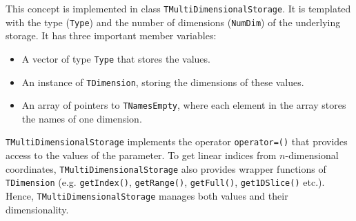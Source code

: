 \documentclass[a4paper,11pt]{article}
\newcommand{\class}[1]{\texttt{#1}}
\newcommand{\pubfunc}[1]{\texttt{#1()}}
\newcommand{\type}[1]{\texttt{#1}}
\begin{document}
This concept is implemented in class \class{TMultiDimensionalStorage}. It is templated with the type (\type{Type}) and the number of dimensions (\type{NumDim}) of the underlying storage. It has three important member variables:
\begin{itemize}
 \item A vector of type \type{Type} that stores the values.
 \item An instance of \class{TDimension}, storing the dimensions of these values.
 \item An array of pointers to \class{TNamesEmpty}, where each element in the array stores the names of one dimension.
\end{itemize}
\class{TMultiDimensionalStorage} implements the operator \pubfunc{operator=} that provides access to the values of the parameter. To get linear indices from $n$-dimensional coordinates, \class{TMultiDimensionalStorage} also provides wrapper functions of \class{TDimension} (e.g. \pubfunc{getIndex}, \pubfunc{getRange}, \pubfunc{getFull}, \pubfunc{get1DSlice} etc.). Hence, \class{TMultiDimensionalStorage} manages both values and their dimensionality. \\
\end{document}
